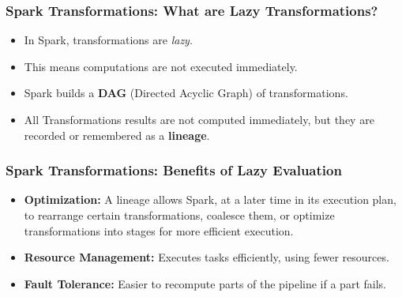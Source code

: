 \begin{frame}
  \frametitle{Spark Transformations: What are Lazy Transformations?}
  \begin{itemize}
    \item In Spark, transformations are \textit{lazy}.
    \item This means computations are not executed immediately.
    \item Spark builds a \textbf{DAG} (Directed Acyclic Graph) of transformations.
    \item All Transformations results are not computed immediately, but they are recorded or remembered as a \textbf{lineage}.
  \end{itemize}
\end{frame}

\begin{frame}
  \frametitle{Spark Transformations: Benefits of Lazy Evaluation}
  \begin{itemize}
    \item \textbf{Optimization:} A lineage allows Spark, at a later time in its execution plan, to rearrange certain transformations, coalesce
    them, or optimize transformations into stages for more efficient execution.
    \item \textbf{Resource Management:} Executes tasks efficiently, using fewer resources.
    \item \textbf{Fault Tolerance:} Easier to recompute parts of the pipeline if a part fails.
  \end{itemize}
\end{frame}

